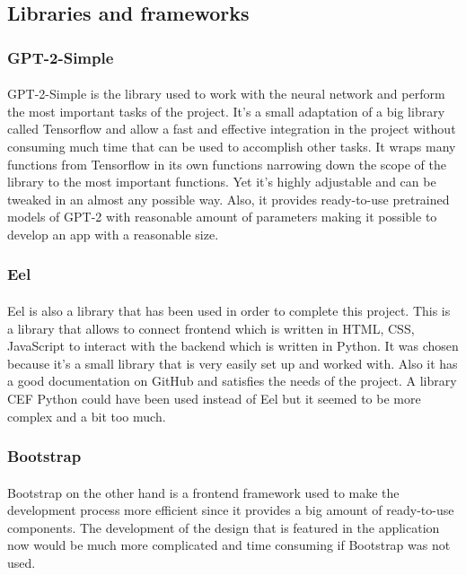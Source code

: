 \documentclass[12pt]{report}
\begin{document}
\subsection*{Libraries and frameworks}
\subsubsection*{GPT-2-Simple}
\paragraph{}
GPT-2-Simple is the library used to work with the neural network and perform the most important tasks of the project.
It's a small adaptation of a big library called Tensorflow and allow a fast and effective integration in the project
without consuming much time that can be used to accomplish other tasks. It wraps many functions from Tensorflow in
its own functions narrowing down the scope of the library to the most important functions. Yet it's highly adjustable
and can be tweaked in an almost any possible way. Also, it provides ready-to-use pretrained models of GPT-2 with
reasonable amount of parameters making it possible to develop an app with a reasonable size.

\subsubsection*{Eel}
\paragraph{}
Eel is also a library that has been used in order to complete this project. This is a library that allows to connect
frontend which is written in HTML, CSS, JavaScript to interact with the backend which is written in Python. It was chosen
because it's a small library that is very easily set up and worked with. Also it has a good documentation on GitHub and
satisfies the needs of the project. A library CEF Python could have been used instead of Eel but it seemed to be more
complex and a bit too much.

\subsubsection*{Bootstrap}
\paragraph{}
Bootstrap on the other hand is a frontend framework used to make the development process more efficient since it provides a big
amount of ready-to-use components. The development of the design that is featured in the application now would be much more
complicated and time consuming if Bootstrap was not used.
\end{document}
